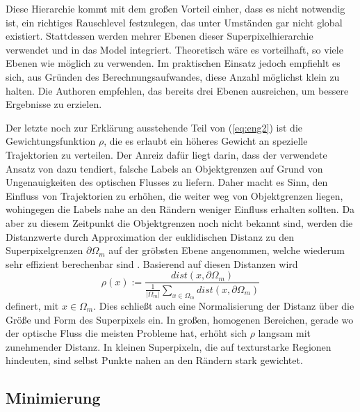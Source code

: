 Diese Hierarchie kommt mit dem großen Vorteil einher, dass es nicht notwendig ist, ein richtiges Rauschlevel festzulegen, das unter Umständen
gar nicht global existiert. Stattdessen werden mehrer Ebenen dieser Superpixelhierarchie verwendet und in das Model integriert. Theoretisch
wäre es vorteilhaft, so viele Ebenen wie möglich zu verwenden. Im praktischen Einsatz jedoch empfiehlt es sich, aus Gründen des Berechnungsaufwandes,
diese Anzahl möglichst klein zu halten. Die Authoren empfehlen, das bereits drei Ebenen ausreichen, um bessere Ergebnisse zu erzielen.

Der letzte noch zur Erklärung ausstehende Teil von (\ref{eq:eng2}) ist die Gewichtungsfunktion $\rho$, die es erlaubt ein höheres Gewicht an spezielle Trajektorien
zu verteilen. Der Anreiz dafür liegt darin, dass der verwendete Ansatz von \cite{007} dazu tendiert, falsche Labels an Objektgrenzen auf Grund
von Ungenauigkeiten des optischen Flusses zu liefern. Daher macht es Sinn, den Einfluss von Trajektorien zu erhöhen, die weiter weg von Objektgrenzen liegen,
wohingegen die Labels nahe an den Rändern weniger Einfluss erhalten sollten. Da aber zu diesem Zeitpunkt die Objektgrenzen noch nicht bekannt sind,
werden die Distanzwerte durch Approximation der euklidischen Distanz zu den Superpixelgrenzen $\partial \Omega_m$ auf der gröbsten Ebene angenommen,
welche wiederum sehr effizient berechenbar sind \cite{010}. Basierend auf diesen Distanzen wird
\begin{equation}
\rho(x) := \frac{dist(x, \partial \Omega_m)}{ \frac{1}{|\Omega_m|} \sum_{x\in \Omega_m} dist(x, \partial \Omega_m)}
\end{equation}
definert, mit $x \in \Omega_m$. Dies schließt auch eine Normalisierung der Distanz über die Größe und Form des Superpixels ein.
In großen, homogenen Bereichen, gerade wo der optische Fluss die meisten Probleme hat, erhöht sich $\rho$ langsam mit zunehmender Distanz.
In kleinen Superpixeln, die auf texturstarke Regionen hindeuten, sind selbst Punkte nahen an den Rändern stark gewichtet.

\subsection{Minimierung}

